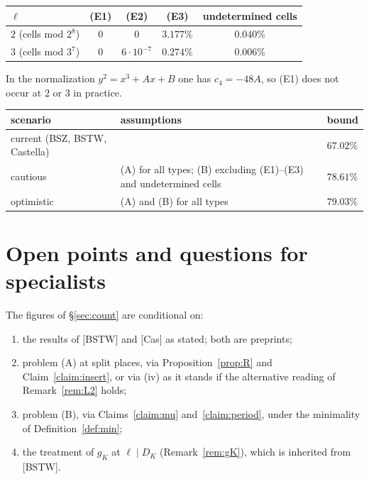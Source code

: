 \documentclass[11pt]{amsart}
\theoremstyle{definition}
\theoremstyle{remark}
\begin{document}
\begin{center}
\begin{tabular}{lcccc}
\toprule
$\ell$ & (E1) & (E2) & (E3) & undetermined cells\\ \midrule
$2$ (cells mod $2^8$) & $0$ & $0$ & $3.177\%$ & $0.040\%$\\
$3$ (cells mod $3^7$) & $0$ & $6\cdot10^{-7}$ & $0.274\%$ & $0.006\%$\\ \bottomrule
\end{tabular}
\end{center}
In the normalization $y^2=x^3+Ax+B$ one has $c_4=-48A$, so (E1) does not occur at $2$ or $3$ in practice.

\begin{center}
\begin{tabular}{p{3.8cm}p{6.8cm}l}
\toprule
scenario & assumptions & bound\\ \midrule
current (BSZ, BSTW, Castella) & & $67.02\%$\\
cautious & (A) for all types; (B) excluding (E1)--(E3) and undetermined cells & $\mathbf{78.61\%}$\\
optimistic & (A) and (B) for all types & $79.03\%$\\ \bottomrule
\end{tabular}
\end{center}

\section{Open points and questions for specialists}\label{sec:open}
The figures of \S\ref{sec:count} are conditional on:
\begin{enumerate}[label=(H\arabic*)]
\item the results of [BSTW] and [Cas] as stated; both are preprints;
\item problem (A) at split places, via Proposition~\ref{prop:R} and Claim~\ref{claim:insert}, or via (iv) as it stands if the alternative reading of Remark~\ref{rem:L2} holds;
\item problem (B), via Claims~\ref{claim:mu} and~\ref{claim:period}, under the minimality of Definition~\ref{def:min};
\item the treatment of $g_K$ at $\ell\mid D_K$ (Remark~\ref{rem:gK}), which is inherited from [BSTW].
\end{enumerate}
\end{document}
